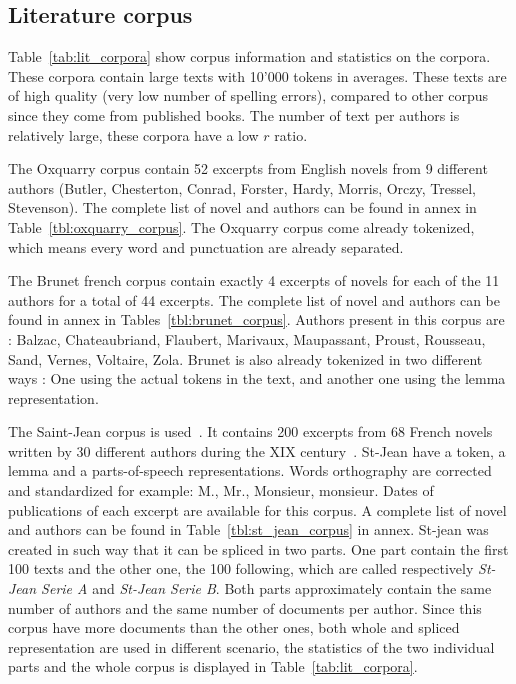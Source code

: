 \subsection{Literature corpus \label{sec:lit_corpus}}

Table~\ref{tab:lit_corpora} show corpus information and statistics on the corpora.
These corpora contain large texts with 10'000 tokens in averages.
These texts are of high quality (very low number of spelling errors), compared to other corpus since they come from published books.
The number of text per authors is relatively large, these corpora have a low $r$ ratio.

The Oxquarry corpus contain 52 excerpts from English novels from 9 different authors (Butler, Chesterton, Conrad, Forster, Hardy, Morris, Orczy, Tressel, Stevenson).
The complete list of novel and authors can be found in annex in Table~\ref{tbl:oxquarry_corpus}.
The Oxquarry corpus come already tokenized, which means every word and punctuation are already separated.

The Brunet french corpus contain exactly 4 excerpts of novels for each of the 11 authors for a total of 44 excerpts.
The complete list of novel and authors can be found in annex in Tables~\ref{tbl:brunet_corpus}.
Authors present in this corpus are : Balzac, Chateaubriand, Flaubert, Marivaux, Maupassant, Proust, Rousseau, Sand, Vernes, Voltaire, Zola.
Brunet is also already tokenized in two different ways : One using the actual tokens in the text, and another one using the lemma representation.

The Saint-Jean corpus is used~\cite{unine_corpus}.
It contains 200 excerpts from 68 French novels written by 30 different authors during the XIX century~\cite{st_jean}.
St-Jean have a token, a lemma and a parts-of-speech representations.
Words orthography are corrected and standardized for example: M., Mr., Monsieur, monsieur.
Dates of publications of each excerpt are available for this corpus.
A complete list of novel and authors can be found in Table~\ref{tbl:st_jean_corpus} in annex.
St-jean was created in such way that it can be spliced in two parts.
One part contain the first 100 texts and the other one, the 100 following, which are called respectively \textit{St-Jean Serie A} and \textit{St-Jean Serie B}.
Both parts approximately contain the same number of authors and the same number of documents per author.
Since this corpus have more documents than the other ones, both whole and spliced representation are used in different scenario, the statistics of the two individual parts and the whole corpus is displayed in Table~\ref{tab:lit_corpora}.

